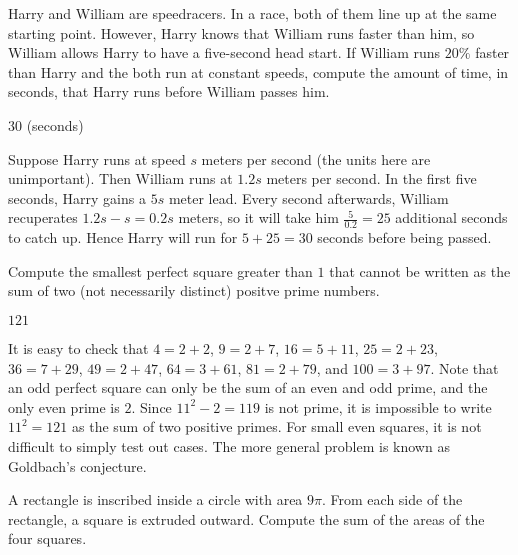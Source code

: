 \documentclass[11pt]{article}
\begin{document}
\begin{problem}%
Harry and William are speedracers. In a race, both of them line up at the same starting point.
However, Harry knows that William runs faster than him, so William allows Harry to have
a five-second head start. If William runs $20\%$ faster than Harry and the both run at
constant speeds, compute the amount of time, in seconds, that Harry runs before William passes him.
\end{problem}

\begin{answer}
$\boxed{30}$ (seconds)
\end{answer}

\begin{solution}
Suppose Harry runs at speed $s$ meters per second (the units here are unimportant). Then William
runs at $1.2s$ meters per second. In the first five seconds, Harry gains a $5s$ meter lead.
Every second afterwards, William recuperates $1.2s - s = 0.2s$ meters, so it will take
him $\frac{5}{0.2} = 25$ additional seconds to catch up. Hence Harry will run for $5 + 25 = \boxed{30}$
seconds before being passed.
\end{solution}


\begin{problem}%
Compute the smallest perfect square greater than $1$ that cannot be written as the sum of two
(not necessarily distinct) positve prime numbers.
\end{problem}

\begin{answer}
$\boxed{121}$
\end{answer}

\begin{solution}
It is easy to check that $4 = 2+2$, $9 = 2+7$, $16 = 5+11$, $25 = 2+23$, $36 = 7+29$, $49 = 2+47$,
$64 = 3+61$, $81 = 2+79$, and $100 = 3+97$. Note that an odd perfect square can only be the
sum of an even and odd prime, and the only even prime is $2$. Since $11^2 - 2 = 119$ is not prime,
it is impossible to write $11^2 = \boxed{121}$ as the sum of two positive primes.
For small even squares, it is not difficult to simply test out cases. The more general problem
is known as Goldbach's conjecture.
\end{solution}


\begin{problem}%
A rectangle is inscribed inside a circle with area $9\pi$. From each side of the rectangle,
a square is extruded outward. Compute the sum of the areas of the four squares.
\end{problem}
\end{document}
